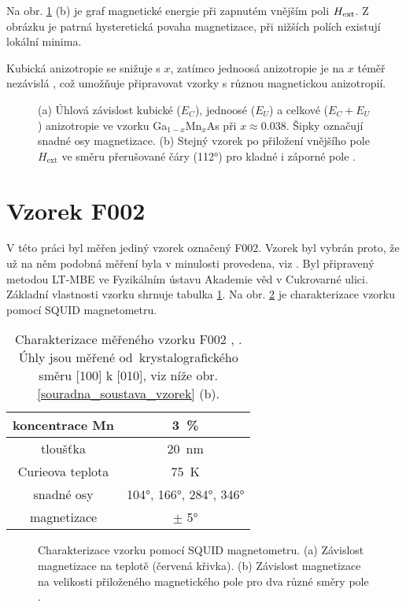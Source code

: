 Na obr. \ref{funkcional_energie} (b) je graf magnetické energie při zapnutém vnějším poli $H_\text{ext}$. Z obrázku je patrná hysteretická povaha magnetizace, při nižších polích existují lokální minima.

Kubická anizotropie se snižuje s $x$, zatímco jednoosá anizotropie je na $x$ téměř nezávislá \cite{Janda}, což umožňuje připravovat vzorky s různou magnetickou anizotropií.

\begin{figure}[htbp]\centering
{}
	\caption{(a) Úhlová závislost kubické ($E_C$), jednoosé ($E_U$) a celkové ($E_C+E_U$) anizotropie ve vzorku Ga$_{1-x}$Mn$_x$As při $x\approx \num{0,038}$. Šipky označují snadné osy magnetizace. 
		(b) Stejný vzorek po přiložení vnějšího pole $H_\text{ext}$ ve směru přerušované čáry (\ang{112}) pro kladné i záporné pole \cite{Janda}.}\label{funkcional_energie}
\end{figure}

\section{Vzorek F002} \label{kap_vzorek}

V této práci byl měřen jediný vzorek označený F002. Vzorek byl vybrán proto, že už na něm podobná měření byla v minulosti provedena, viz \cite{Reichlova}. Byl připravený metodou LT-MBE ve Fyzikálním ústavu Akademie věd v Cukrovarné ulici. Základní vlastnosti vzorku shrnuje tabulka \ref{tab_vzorek}. Na obr. \ref{charakterizace_vzorku} je charakterizace vzorku pomocí SQUID magnetometru.

\begin{table}[htbp]	
	\centering	
	\begin{tabular}{c|c}
		koncentrace Mn & \SI{3}{\percent} \\ \hline
		tloušťka & \SI{20}{\nano\metre} \\ \hline
		Curieova teplota & \SI{75}{\kelvin} \\ \hline
		snadné osy & \ang{104}, \ang{166}, \ang{284}, \ang{346} \\
		magnetizace & $\pm$ \ang{5}
	\end{tabular}
	\caption{Charakterizace měřeného vzorku F002 \cite{Reichlova}, \cite{TesarovaDisertace}. Úhly jsou měřené od~krystalografického směru [100] k [010], viz níže obr. \ref{souradna_soustava_vzorek} (b).}
	\label{tab_vzorek}
\end{table}


\begin{figure}[htbp]\centering
	\caption{Charakterizace vzorku pomocí SQUID magnetometru. (a) Závislost magnetizace na teplotě (červená křivka). (b) Závislost magnetizace na velikosti přiloženého magnetického pole pro dva různé směry pole \cite{Reichlova}.}\label{charakterizace_vzorku}
\end{figure}

